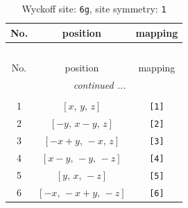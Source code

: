 \documentclass[fleqn,8pt]{jsarticle}
\begin{document}
\begin{longtable}{ccc}
\caption{Wyckoff site: {\tt 6g}, site symmetry: {\tt 1}}
 \\
 \hline \hline
No. & position & mapping \\ \hline \endfirsthead

\multicolumn{2}{l}{\tablename\ \thetable{}} \\
 \hline \hline
No. & position & mapping \\ \hline \endhead

 \hline \hline
\multicolumn{2}{r}{\footnotesize\it continued ...} \\ \endfoot

 \hline \hline
\multicolumn{2}{r}{} \\ \endlastfoot

1 & $\left[ x,\, y,\, z \right]$ & {\tt [1]} \\ \hline
2 & $\left[ - y,\, x - y,\, z \right]$ & {\tt [2]} \\ \hline
3 & $\left[ - x + y,\, - x,\, z \right]$ & {\tt [3]} \\ \hline
4 & $\left[ x - y,\, - y,\, - z \right]$ & {\tt [4]} \\ \hline
5 & $\left[ y,\, x,\, - z \right]$ & {\tt [5]} \\ \hline
6 & $\left[ - x,\, - x + y,\, - z \right]$ & {\tt [6]} \\
\end{longtable}
\end{document}

